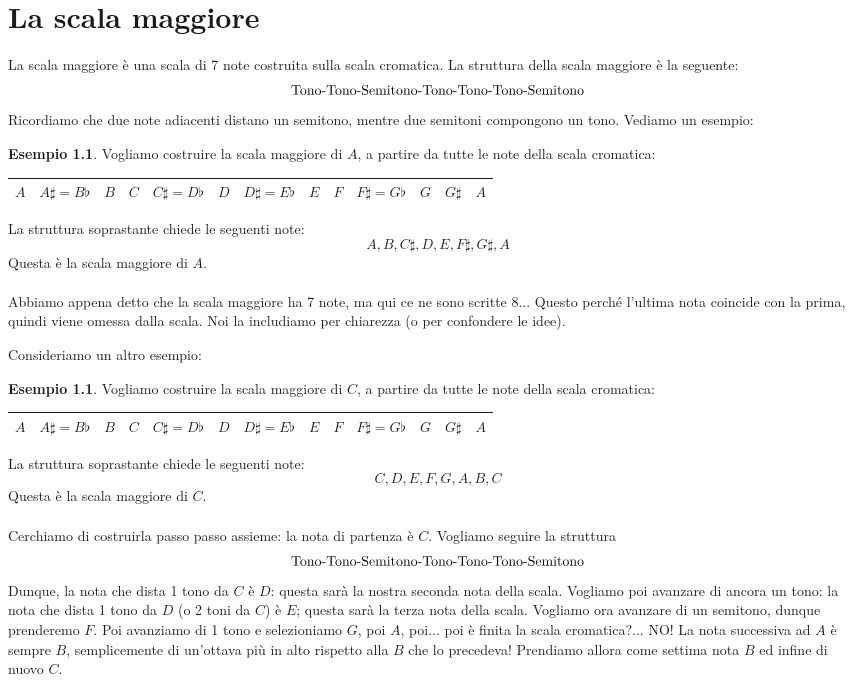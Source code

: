 \documentclass[12pt,a4paper]{report}
\theoremstyle{definition}
\theoremstyle{Theorem}
\theoremstyle{definition}
\newtheorem{Ex}[Def]{Esempio}
\theoremstyle{definition}
\theoremstyle{definition}
\begin{document}
	 \chapter{La scala maggiore}
	 La scala maggiore è una scala di 7 note costruita sulla scala cromatica. La struttura della scala maggiore è la seguente:
	 $$\hbox{Tono-Tono-Semitono-Tono-Tono-Tono-Semitono}$$ 
	 Ricordiamo che due note adiacenti distano un semitono, mentre due semitoni compongono un tono. Vediamo un esempio:
	 \begin{Ex}
	 	Vogliamo costruire la scala maggiore di $A$, a partire da tutte le note della scala cromatica:
	 	\begin{center}
	 		\begin{tabular}{|c|c|c|c|c|c|c|c|c|c|c|c|c|}
	 			\hline
	 			$A$&$A\sharp=B\flat$&$B$&$C$&$C\sharp=D\flat$&$D$&$D\sharp=E\flat$&$E$&$F$&$F\sharp=G\flat$&$G$&$G\sharp$&$A$ \\
	 			\hline
	 		\end{tabular}
	 	\end{center}
	 	La struttura soprastante chiede le seguenti note:
	 	$$A,B,C\sharp,D,E,F\sharp,G\sharp,A$$
	 	Questa è la scala maggiore di $A$.\\
	 	\\
	 	Abbiamo appena detto che la scala maggiore ha 7 note, ma qui ce ne sono scritte 8...
	 	Questo perché l'ultima nota coincide con la prima, quindi viene omessa dalla scala. Noi la includiamo per chiarezza (o per confondere le idee).\\
	 		 \end{Ex}
	 		 Consideriamo un altro esempio:
	 \begin{Ex}
	 	Vogliamo costruire la scala maggiore di $C$, a partire da tutte le note della scala cromatica:
	 		 	\begin{center}
	 		 		\begin{tabular}{|c|c|c|c|c|c|c|c|c|c|c|c|c|}
	 		 			\hline
	 		 			$A$&$A\sharp=B\flat$&$B$&$C$&$C\sharp=D\flat$&$D$&$D\sharp=E\flat$&$E$&$F$&$F\sharp=G\flat$&$G$&$G\sharp$&$A$ \\
	 		 			\hline
	 		 	\end{tabular}
	 		 \end{center}
	 		 La struttura soprastante chiede le seguenti note:
	 		 	$$C,D,E,F,G,A,B,C$$
	 		 Questa è la scala maggiore di $C$.\\
	 		 \\
	 		 Cerchiamo di costruirla passo passo assieme: la nota di partenza è $C$. Vogliamo seguire la struttura
	 		 $$\hbox{Tono-Tono-Semitono-Tono-Tono-Tono-Semitono}$$
	 		 Dunque, la nota che dista 1 tono da $C$ è $D$: questa sarà la nostra seconda nota della scala. Vogliamo poi avanzare di ancora un tono: la nota che dista 1 tono da $D$ (o 2 toni da $C$) è $E$; questa sarà la terza nota della scala. Vogliamo ora avanzare di un semitono, dunque prenderemo $F$. Poi avanziamo di 1 tono e selezioniamo $G$, poi $A$, poi... poi è finita la scala cromatica?... NO! La nota successiva ad $A$ è sempre $B$, semplicemente di un'ottava più in alto rispetto alla $B$ che lo precedeva! Prendiamo allora come settima nota $B$ ed infine di nuovo $C$. 
	 		 \end{Ex}
\end{document}
